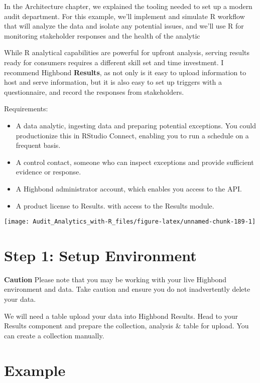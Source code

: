 \documentclass[
]{book}
\providecommand{\tightlist}{%
  \setlength{\itemsep}{0pt}\setlength{\parskip}{0pt}}
\begin{document}
In the \protect\hypertarget{architecture}{}{Architecture chapter}, we explained the tooling needed to set up a modern audit department. For this example, we'll implement and simulate R workflow that will analyze the data and isolate any potential issues, and we'll use R for monitoring stakeholder responses and the health of the analytic

While R analytical capabilities are powerful for upfront analysis, serving results ready for consumers requires a different skill set and time investment. I recommend Highbond \textbf{Results}, as not only is it easy to upload information to host and serve information, but it is also easy to set up triggers with a questionnaire, and record the responses from stakeholders.

Requirements:

\begin{itemize}
\tightlist
\item
  A data analytic, ingesting data and preparing potential exceptions. You could productionize this in RStudio Connect, enabling you to run a schedule on a frequent basis.
\item
  A control contact, someone who can inspect exceptions and provide sufficient evidence or response.
\item
  A Highbond administrator account, which enables you access to the API.
\item
  A product license to Results. with access to the Results module.
\end{itemize}

\texttt{[image: Audit\_Analytics\_with-R\_files/figure-latex/unnamed-chunk-189-1]}

\hypertarget{step-1-setup-environment}{%
\section{Step 1: Setup Environment}\label{step-1-setup-environment}}

\textbf{Caution} Please note that you may be working with your live Highbond environment and data. Take caution and ensure you do not inadvertently delete your data.

We will need a table upload your data into Highbond Results. Head to your Results component and prepare the collection, analysis \& table for upload. You can create a collection manually.

\hypertarget{example}{%
\section{Example}\label{example}}
\end{document}
